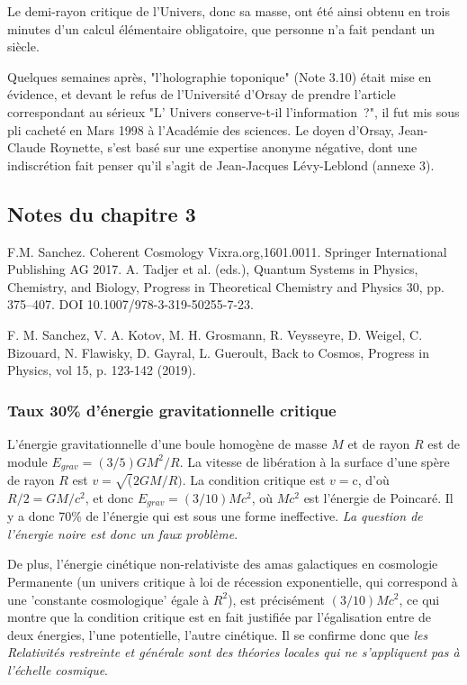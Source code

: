 \documentclass[a4paper,12pt]{article}
\begin{document}
Le demi-rayon critique de l'Univers, donc sa masse, ont été ainsi obtenu en trois minutes d’un calcul élémentaire obligatoire, que personne n’a fait pendant un siècle.

Quelques semaines après, "l'holographie toponique" (Note 3.10) était mise en évidence, et devant le refus de l'Université d'Orsay de prendre l'article correspondant au sérieux "L' Univers conserve-t-il l'information ?", il fut mis sous pli cacheté en Mars 1998 à l'Académie des sciences. Le doyen d'Orsay, Jean-Claude Roynette, s'est basé sur une expertise anonyme négative, dont une indiscrétion fait penser qu'il s'agit de Jean-Jacques Lévy-Leblond (annexe 3). 


\subsection{Notes du chapitre 3}
 
F.M. Sanchez. Coherent Cosmology Vixra.org,1601.0011. Springer International Publishing AG 2017. A. Tadjer et al. (eds.), Quantum Systems in Physics, Chemistry, and Biology, Progress in Theoretical Chemistry and Physics 30, pp. 375--407. DOI 10.1007/978-3-319-50255-7-23. 

F. M. Sanchez, V. A. Kotov,  M. H. Grosmann, R. Veysseyre, D. Weigel, C. Bizouard, N. Flawisky, D. Gayral, L. Gueroult, Back to Cosmos, Progress in Physics, vol 15, p. 123-142 (2019). 



\subsubsection{Taux 30\% d'énergie gravitationnelle critique  }

L'énergie gravitationnelle d'une boule homogène de masse $M$ et de rayon $R$ est de module $E_{grav} = (3/5)GM^2/R$. La vitesse de libération à la surface d’une spère de rayon $R$ est $v =\sqrt(2GM/R)$. La condition critique est $v = $c, d'où  $R/2 = GM/c^2$, et donc $E_{grav} = (3/10) Mc^2$, où $Mc^2$ est l'énergie de Poincaré. Il y a donc 70\% de l'énergie qui est sous une forme ineffective. \textit{La question de l’énergie noire est donc un faux problème}.


De plus, l'énergie cinétique non-relativiste des amas galactiques en cosmologie Permanente (un univers critique à loi de récession exponentielle, qui correspond à une 'constante cosmologique' égale à $R^2$), est précisément $(3/10) Mc^2$, ce qui montre que la condition critique est en fait justifiée par l'égalisation entre de deux énergies, l'une potentielle, l'autre cinétique. Il se confirme donc que \textit{les Relativités restreinte et générale sont des théories locales qui ne s'appliquent pas à l'échelle cosmique}.
\end{document}
